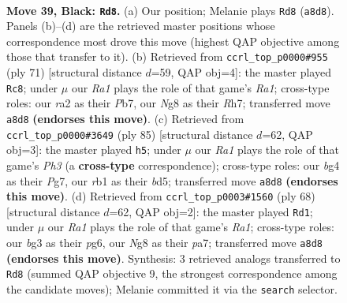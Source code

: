 \documentclass[11pt]{article}
\begin{document}
\clearpage

\begin{figure}[p]\centering
\begin{subfigure}{0.46\textwidth}\centering
\resizebox{\linewidth}{!}{%
\newchessgame
\chessboard[
  setfen={r5nr/p6p/5k2/8/P5B1/1Pp1b1BP/R1P3P1/1R5K b - - 0 39},
  showmover=false,
  pgfstyle=straightmove, color=movearrow, markmove={a8-d8}
]}
\caption{}
\end{subfigure}\hfill
\begin{subfigure}{0.46\textwidth}\centering
\resizebox{\linewidth}{!}{%
\newchessgame
\chessboard[
  setfen={r7/pp5r/8/P2RPp1k/1p1P4/6Pp/7P/R5K1 b - - 0 36},
  showmover=false,
  pgfstyle=straightmove, color=movearrow, markmove={a8-c8}
]}
\caption{}
\end{subfigure}
\\[4pt]
\begin{subfigure}{0.46\textwidth}\centering
\resizebox{\linewidth}{!}{%
\newchessgame
\chessboard[
  setfen={5k2/6p1/pr5p/1p1B1p2/3P4/bP4P1/P2R1PK1/8 b - - 0 43},
  showmover=false,
  pgfstyle=straightmove, color=movearrow, markmove={h6-h5}
]}
\caption{}
\end{subfigure}\hfill
\begin{subfigure}{0.46\textwidth}\centering
\resizebox{\linewidth}{!}{%
\newchessgame
\chessboard[
  setfen={3rk3/p3pp1p/1p1b2p1/8/P7/7P/2R2PP1/R6K w - - 0 35},
  showmover=false,
  pgfstyle=straightmove, color=movearrow, markmove={a1-d1}
]}
\caption{}
\end{subfigure}
\caption{\textbf{Move 39, Black: \texttt{Rd8}.} (a) Our position; Melanie plays \texttt{Rd8} (\texttt{a8d8}). Panels (b)--(d) are the retrieved master positions whose correspondence most drove this move (highest QAP objective among those that transfer to it). (b) Retrieved from \texttt{ccrl\_top\_p0000\#955} (ply 71) [structural distance $d$=59, QAP obj=4]: the master played \texttt{Rc8}; under $\mu$ our \emph{Ra1} plays the role of that game's \emph{Ra1}; cross-type roles: our \emph{r}a2 as their \emph{P}b7, our \emph{N}g8 as their \emph{R}h7; transferred move \texttt{a8d8} \textbf{(endorses this move)}. (c) Retrieved from \texttt{ccrl\_top\_p0000\#3649} (ply 85) [structural distance $d$=62, QAP obj=3]: the master played \texttt{h5}; under $\mu$ our \emph{Ra1} plays the role of that game's \emph{Ph3} (a \textbf{cross-type} correspondence); cross-type roles: our \emph{b}g4 as their \emph{P}g7, our \emph{r}b1 as their \emph{b}d5; transferred move \texttt{a8d8} \textbf{(endorses this move)}. (d) Retrieved from \texttt{ccrl\_top\_p0003\#1560} (ply 68) [structural distance $d$=62, QAP obj=2]: the master played \texttt{Rd1}; under $\mu$ our \emph{Ra1} plays the role of that game's \emph{Ra1}; cross-type roles: our \emph{b}g3 as their \emph{p}g6, our \emph{N}g8 as their \emph{p}a7; transferred move \texttt{a8d8} \textbf{(endorses this move)}. Synthesis: 3 retrieved analogs transferred to \texttt{Rd8} (summed QAP objective 9, the strongest correspondence among the candidate moves); Melanie committed it via the \texttt{search} selector.}
\label{fig:thought-m77}
\end{figure}
\end{document}
